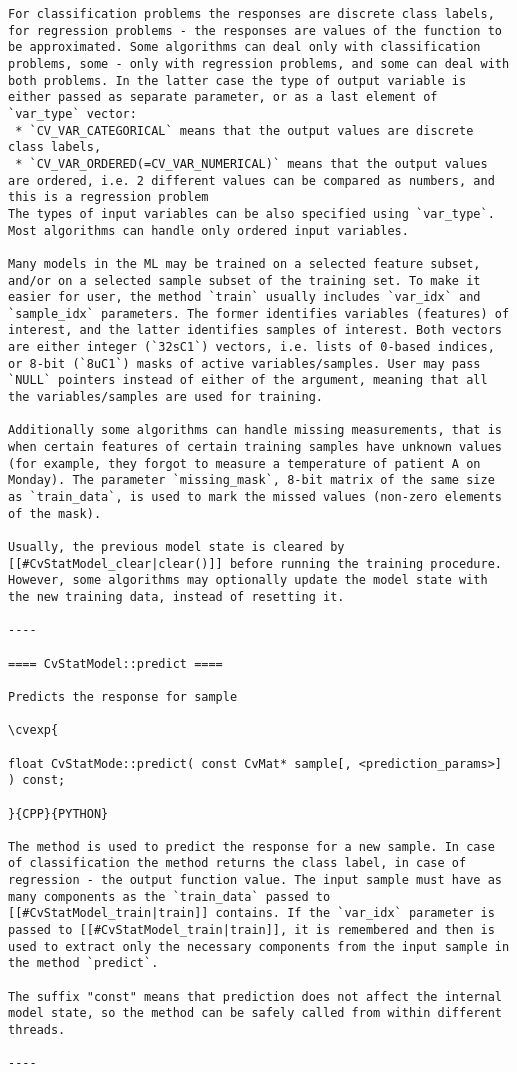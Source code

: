\begin{verbatim}
For classification problems the responses are discrete class labels, for regression problems - the responses are values of the function to be approximated. Some algorithms can deal only with classification problems, some - only with regression problems, and some can deal with both problems. In the latter case the type of output variable is either passed as separate parameter, or as a last element of `var_type` vector:
 * `CV_VAR_CATEGORICAL` means that the output values are discrete class labels,
 * `CV_VAR_ORDERED(=CV_VAR_NUMERICAL)` means that the output values are ordered, i.e. 2 different values can be compared as numbers, and this is a regression problem
The types of input variables can be also specified using `var_type`. Most algorithms can handle only ordered input variables.

Many models in the ML may be trained on a selected feature subset, and/or on a selected sample subset of the training set. To make it easier for user, the method `train` usually includes `var_idx` and `sample_idx` parameters. The former identifies variables (features) of interest, and the latter identifies samples of interest. Both vectors are either integer (`32sC1`) vectors, i.e. lists of 0-based indices, or 8-bit (`8uC1`) masks of active variables/samples. User may pass `NULL` pointers instead of either of the argument, meaning that all the variables/samples are used for training.

Additionally some algorithms can handle missing measurements, that is when certain features of certain training samples have unknown values (for example, they forgot to measure a temperature of patient A on Monday). The parameter `missing_mask`, 8-bit matrix of the same size as `train_data`, is used to mark the missed values (non-zero elements of the mask).

Usually, the previous model state is cleared by [[#CvStatModel_clear|clear()]] before running the training procedure. However, some algorithms may optionally update the model state with the new training data, instead of resetting it.

----

==== CvStatModel::predict ====

Predicts the response for sample

\cvexp{

float CvStatMode::predict( const CvMat* sample[, <prediction_params>] ) const;

}{CPP}{PYTHON}

The method is used to predict the response for a new sample. In case of classification the method returns the class label, in case of regression - the output function value. The input sample must have as many components as the `train_data` passed to [[#CvStatModel_train|train]] contains. If the `var_idx` parameter is passed to [[#CvStatModel_train|train]], it is remembered and then is used to extract only the necessary components from the input sample in the method `predict`.

The suffix "const" means that prediction does not affect the internal model state, so the method can be safely called from within different threads.

----

\end{verbatim}
